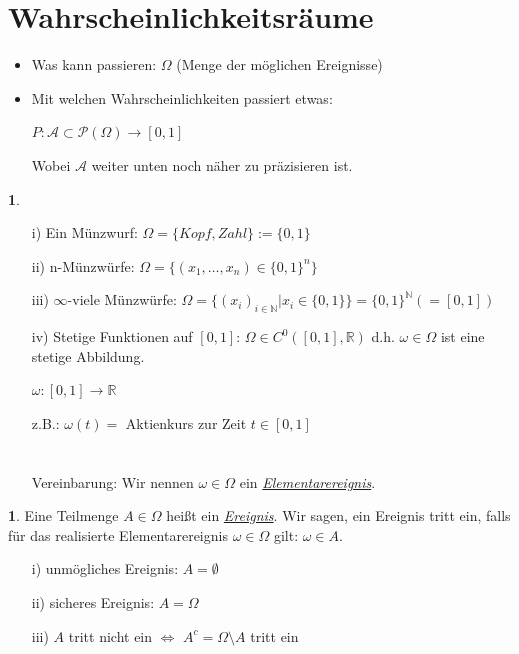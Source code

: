 \documentclass[10pt,a4paper]{report}
\numberwithin{equation}{section}
\numberwithin{figure}{section}
\theoremstyle{plain}
\theoremstyle{definition}
\newtheorem{defn}[thm]{\protect\definitionname}
\newtheorem{example}[thm]{\protect\examplename}
\theoremstyle{remark}
\theoremstyle{plain}
\providecommand{\definitionname}{Definition}
\providecommand{\examplename}{Beispiel}
\newcommand{\1}{ \mathbb{1} } %
\begin{document}
\section{Wahrscheinlichkeitsräume}
\label{sec:wraeume}
\begin{itemize}
\item Was kann passieren: $\Omega$ (Menge der möglichen Ereignisse)
\item Mit welchen Wahrscheinlichkeiten passiert etwas:
\begin{center}
$P: \mathcal{A} \subset \mathcal{P}(\Omega) \rightarrow [0,1]$
\end{center}
Wobei $\mathcal{A}$ weiter unten noch näher zu präzisieren ist.
\end{itemize}
\begin{example}
  \begin{itemize}
  \item[i)] Ein Münzwurf: $\Omega=\{Kopf, Zahl\}:=\{0,1\}$
   \item[ii)] n-Münzwürfe: $\Omega=\{(x_1,\dots,x_n) \in \{0,1\}^n\}$
   \item[iii)] $\infty$-viele Münzwürfe: $\Omega=\{(x_i)_{i\in \mathbb{N}}|x_i \in \{0,1\}\}=\{0,1\}^\mathbb{N}(=[0,1])$
   \item[iv)] Stetige Funktionen auf $[0,1]$: $\Omega \in
    C^0([0,1],\mathbb{R})$ d.h. $\omega \in \Omega$ ist eine stetige Abbildung.
    \begin{center}
      $\omega: [0,1] \rightarrow \mathbb{R}$
    \end{center}
    z.B.: $\omega(t)=$ Aktienkurs zur Zeit $t \in [0,1]$\\\\\\
    Vereinbarung: Wir nennen $\omega \in \Omega$ ein \underline{\textit{Elementarereignis}}.
  \end{itemize}
\end{example}
\begin{defn}
  Eine Teilmenge $A \in \Omega$ heißt ein \underline{\textit{Ereignis}}. 
  Wir sagen, ein Ereignis tritt ein, falls für das realisierte Elementarereignis $\omega \in \Omega$ gilt: $\omega \in A$.
  \begin{itemize}
  \item[i)] unmögliches Ereignis: $A=\emptyset$
  \item[ii)] sicheres Ereignis: $A=\Omega$
  \item[iii)] $A$ tritt nicht ein $\Leftrightarrow$ $A^c=\Omega\setminus A$ tritt ein 
  \end{itemize}
\end{defn}
\end{document}
